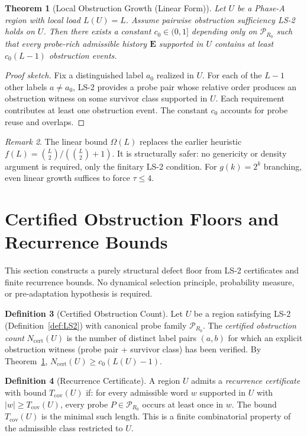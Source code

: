 \documentclass[11pt,a4paper]{article}
\newtheorem{theorem}{Theorem}[section]
\theoremstyle{definition}
\newtheorem{definition}[theorem]{Definition}
\theoremstyle{remark}
\newtheorem{remark}[theorem]{Remark}
\begin{document}
\begin{theorem}[Local Obstruction Growth (Linear Form)]\label{thm:obstruct}
Let $U$ be a Phase-A region with local load $L(U) = L$. Assume pairwise obstruction sufficiency LS-2 holds on $U$. Then there exists a constant $c_0 \in (0,1]$ depending only on $\mathcal{P}_{R_0}$ such that every probe-rich admissible history $\mathbf{E}$ supported in $U$ contains at least $c_0(L-1)$ obstruction events.
\end{theorem}
\begin{proof}[Proof sketch]
Fix a distinguished label $a_0$ realized in $U$. For each of the $L-1$ other labels $a \neq a_0$, LS-2 provides a probe pair whose relative order produces an obstruction witness on some survivor class supported in $U$. Each requirement contributes at least one obstruction event. The constant $c_0$ accounts for probe reuse and overlaps.
\end{proof}

\begin{remark}\label{rem:growth}
The linear bound $\Omega(L)$ replaces the earlier heuristic $f(L) = \binom{L}{2}/(\binom{L}{2}+1)$. It is structurally safer: no genericity or density argument is required, only the finitary LS-2 condition. For $g(k) = 2^k$ branching, even linear growth suffices to force $\tau \leq 4$.
\end{remark}


\section{Certified Obstruction Floors and Recurrence Bounds}

This section constructs a purely structural defect floor from LS-2 certificates and finite recurrence bounds. No dynamical selection principle, probability measure, or pre-adaptation hypothesis is required.

\begin{definition}[Certified Obstruction Count]\label{def:ncert}
Let $U$ be a region satisfying LS-2 (Definition~\ref{def:LS2}) with canonical probe family $\mathcal{P}_{R_0}$. The \emph{certified obstruction count} $N_{\mathrm{cert}}(U)$ is the number of distinct label pairs $(a,b)$ for which an explicit obstruction witness (probe pair + survivor class) has been verified. By Theorem~\ref{thm:obstruct}, $N_{\mathrm{cert}}(U) \geq c_0(L(U) - 1)$.
\end{definition}

\begin{definition}[Recurrence Certificate]\label{def:reccert}
A region $U$ admits a \emph{recurrence certificate} with bound $T_{\mathrm{cov}}(U)$ if: for every admissible word $w$ supported in $U$ with $|w| \geq T_{\mathrm{cov}}(U)$, every probe $P \in \mathcal{P}_{R_0}$ occurs at least once in $w$. The bound $T_{\mathrm{cov}}(U)$ is the minimal such length. This is a finite combinatorial property of the admissible class restricted to $U$.
\end{definition}
\end{document}
